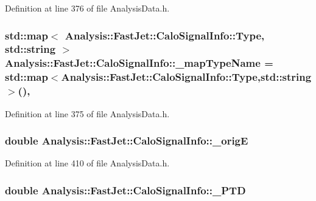 Definition at line 376 of file Analysis\+Data.\+h.

\subsubsection[{\texorpdfstring{\+\_\+map\+Type\+Name}{_mapTypeName}}]{\setlength{\rightskip}{0pt plus 5cm}std\+::map$<$ {\bf Analysis\+::\+Fast\+Jet\+::\+Calo\+Signal\+Info\+::\+Type}, std\+::string $>$ Analysis\+::\+Fast\+Jet\+::\+Calo\+Signal\+Info\+::\+\_\+map\+Type\+Name = std\+::map$<${\bf Analysis\+::\+Fast\+Jet\+::\+Calo\+Signal\+Info\+::\+Type},std\+::string$>$()\hspace{0.3cm}{\ttfamily [static]}, {\ttfamily [protected]}}\hypertarget{classAnalysis_1_1FastJet_1_1CaloSignalInfo_a02077135796cf03c3d55144e7201c2db}{}\label{classAnalysis_1_1FastJet_1_1CaloSignalInfo_a02077135796cf03c3d55144e7201c2db}


Definition at line 375 of file Analysis\+Data.\+h.

\subsubsection[{\texorpdfstring{\+\_\+origE}{_origE}}]{\setlength{\rightskip}{0pt plus 5cm}double Analysis\+::\+Fast\+Jet\+::\+Calo\+Signal\+Info\+::\+\_\+origE\hspace{0.3cm}{\ttfamily [protected]}}\hypertarget{classAnalysis_1_1FastJet_1_1CaloSignalInfo_a55ae2c4227e431ea9f322461173628a6}{}\label{classAnalysis_1_1FastJet_1_1CaloSignalInfo_a55ae2c4227e431ea9f322461173628a6}


Definition at line 410 of file Analysis\+Data.\+h.

\subsubsection[{\texorpdfstring{\+\_\+\+P\+TD}{_PTD}}]{\setlength{\rightskip}{0pt plus 5cm}double Analysis\+::\+Fast\+Jet\+::\+Calo\+Signal\+Info\+::\+\_\+\+P\+TD\hspace{0.3cm}{\ttfamily [protected]}}\hypertarget{classAnalysis_1_1FastJet_1_1CaloSignalInfo_a4824760bad2a7b7683145a95e667a436}{}\label{classAnalysis_1_1FastJet_1_1CaloSignalInfo_a4824760bad2a7b7683145a95e667a436}


